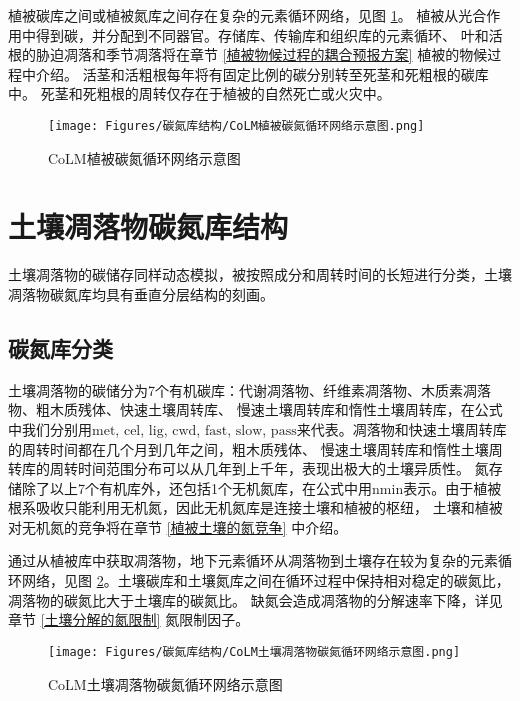 植被碳库之间或植被氮库之间存在复杂的元素循环网络，见图 \ref{fig:CoLM植被碳氮循环网络示意图}。
植被从光合作用中得到碳，并分配到不同器官。存储库、传输库和组织库的元素循环、
叶和活根的胁迫凋落和季节凋落将在章节 \ref{植被物候过程的耦合预报方案} 植被的物候过程中介绍。
活茎和活粗根每年将有固定比例的碳分别转至死茎和死粗根的碳库中。
死茎和死粗根的周转仅存在于植被的自然死亡或火灾中。
{
  \begin{figure}[htbp]
    \centering
    \texttt{[image: Figures/碳氮库结构/CoLM植被碳氮循环网络示意图.png]}
    \caption[CoLM植被碳氮循环网络示意图]{CoLM植被碳氮循环网络示意图 \citep{lu2020full}}
    \label{fig:CoLM植被碳氮循环网络示意图}
  \end{figure}
}

\section{土壤凋落物碳氮库结构}\label{土壤凋落物碳氮库结构}
土壤凋落物的碳储存同样动态模拟，被按照成分和周转时间的长短进行分类，土壤凋落物碳氮库均具有垂直分层结构的刻画。
\subsection{碳氮库分类}\label{碳氮库分类}
土壤凋落物的碳储分为7个有机碳库：代谢凋落物、纤维素凋落物、木质素凋落物、粗木质残体、快速土壤周转库、
慢速土壤周转库和惰性土壤周转库，在公式中我们分别用${\mathrm {met}}$, ${\mathrm {cel}}$, ${\mathrm {lig}}$, ${\mathrm {cwd}}$, ${\mathrm {fast}}$, ${\mathrm {slow}}$, ${\mathrm {pass}}$来代表。凋落物和快速土壤周转库的周转时间都在几个月到几年之间，粗木质残体、
慢速土壤周转库和惰性土壤周转库的周转时间范围分布可以从几年到上千年，表现出极大的土壤异质性。
氮存储除了以上7个有机库外，还包括1个无机氮库，在公式中用${\mathrm {nmin}}$表示。由于植被根系吸收只能利用无机氮，因此无机氮库是连接土壤和植被的枢纽，
土壤和植被对无机氮的竞争将在章节 \ref{植被土壤的氮竞争} 中介绍。


通过从植被库中获取凋落物，地下元素循环从凋落物到土壤存在较为复杂的元素循环网络，见图 \ref{fig:CoLM土壤凋落物碳氮循环网络示意图}。土壤碳库和土壤氮库之间在循环过程中保持相对稳定的碳氮比，凋落物的碳氮比大于土壤库的碳氮比。
缺氮会造成凋落物的分解速率下降，详见章节 \ref{土壤分解的氮限制} 氮限制因子。
{
  \begin{figure}[htbp]
    \centering
    \texttt{[image: Figures/碳氮库结构/CoLM土壤凋落物碳氮循环网络示意图.png]}
    \caption[CoLM土壤凋落物碳氮循环网络示意图]{CoLM土壤凋落物碳氮循环网络示意图 \citep{huang2018matrix}  }
    \label{fig:CoLM土壤凋落物碳氮循环网络示意图}
  \end{figure}
}
